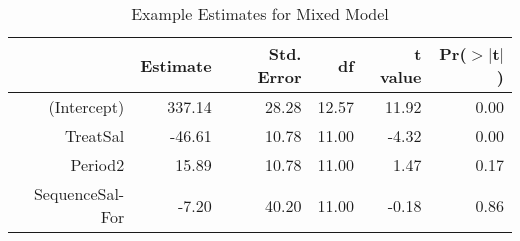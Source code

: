 \begin{table}[ht]
\centering
\begin{tabular}{rrrrrr}
  \hline
 & Estimate & Std. Error & df & t value & Pr($>$$|$t$|$) \\ 
  \hline
(Intercept) & 337.14 & 28.28 & 12.57 & 11.92 & 0.00 \\ 
  TreatSal & -46.61 & 10.78 & 11.00 & -4.32 & 0.00 \\ 
  Period2 & 15.89 & 10.78 & 11.00 & 1.47 & 0.17 \\ 
  SequenceSal-For & -7.20 & 40.20 & 11.00 & -0.18 & 0.86 \\ 
   \hline
\end{tabular}
\caption{Example Estimates for Mixed Model} 
\label{modelTable}
\end{table}

